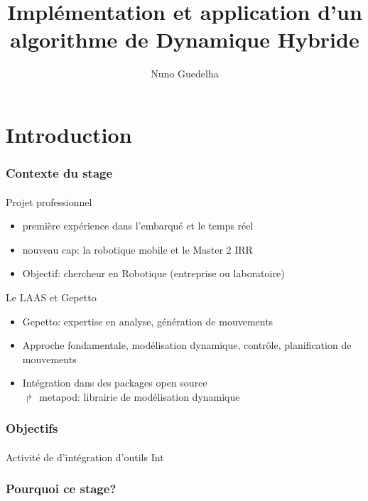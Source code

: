 \documentclass[11pt]{beamer}
\author{Nuno Guedelha}
\title{Implémentation et application d'un algorithme de Dynamique Hybride}
\institute{LAAS-CNRS}
\date{}
\begin{document}
\begin{frame}
\titlepage
\end{frame}

\begin{frame}
\tableofcontents
\end{frame}

\section{Introduction}

\begin{frame}
  \frametitle{Contexte du stage}
  \framesubtitle{}
  \begin{block}{Projet professionnel}
  \begin{itemize}
    \item première expérience dans l'embarqué et le temps réel
    \item nouveau cap: la robotique mobile et le Master 2 IRR
    \item Objectif: chercheur en Robotique (entreprise ou laboratoire)
  \end{itemize}
  \end{block}
  \begin{block}{Le LAAS et Gepetto}
  \begin{itemize}
    \item Gepetto: expertise en analyse, génération de mouvements  
    \item Approche fondamentale, modélisation dynamique, contrôle, planification de mouvements
    \item {Intégration dans des packages open source \\
          $\Rsh$ metapod: librairie de modélisation dynamique}
    \note{}
  \end{itemize}
  \end{block}
\end{frame}

\begin{frame}
  \frametitle{Objectifs}
  \framesubtitle{}
  Activité de d'intégration d'outils
  Int
\end{frame}

\begin{frame}
  \frametitle{Pourquoi ce stage?}
  \framesubtitle{}
\end{frame}
\end{document}
